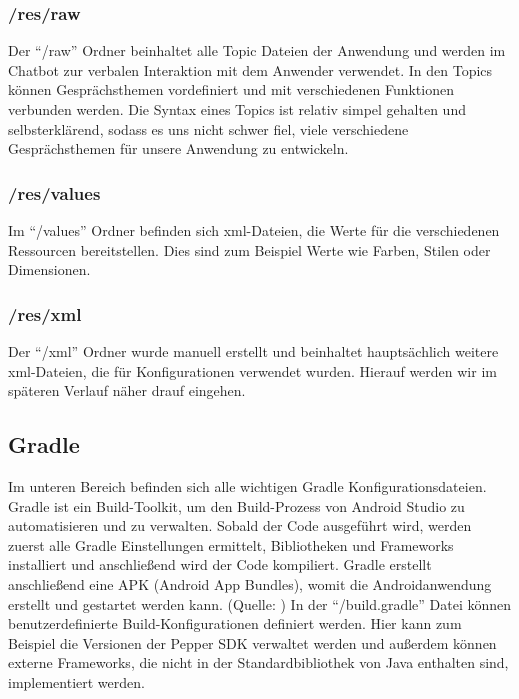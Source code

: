 \subsubsection*{/res/raw}
Der ``/raw'' Ordner beinhaltet alle Topic Dateien der Anwendung und werden im Chatbot zur verbalen Interaktion mit dem Anwender 
verwendet. In den Topics können Gesprächsthemen vordefiniert und mit verschiedenen Funktionen verbunden werden. Die Syntax eines Topics ist 
relativ simpel gehalten und selbsterklärend, sodass es uns nicht schwer fiel, viele verschiedene Gesprächsthemen für unsere Anwendung zu entwickeln. \\

\subsubsection*{/res/values}
Im ``/values'' Ordner befinden sich xml-Dateien, die Werte für die verschiedenen Ressourcen bereitstellen. Dies sind zum Beispiel
 Werte wie Farben, Stilen oder Dimensionen.\\

 \subsubsection*{/res/xml}
Der ``/xml'' Ordner wurde manuell erstellt und beinhaltet hauptsächlich weitere xml-Dateien, die für Konfigurationen verwendet 
wurden. Hierauf werden wir im späteren Verlauf näher drauf eingehen. \\

\subsection{Gradle}

Im unteren Bereich befinden sich alle wichtigen Gradle Konfigurationsdateien. Gradle ist ein Build-Toolkit, um den Build-Prozess von Android Studio 
zu automatisieren und zu verwalten. Sobald der Code ausgeführt wird, werden zuerst alle Gradle Einstellungen ermittelt, Bibliotheken und Frameworks 
installiert und anschließend wird der Code kompiliert. Gradle erstellt anschließend eine APK (Android App Bundles), womit die Androidanwendung 
erstellt und gestartet werden kann. 
(Quelle: \cite{Gradle})
In der ``/build.gradle'' Datei können benutzerdefinierte Build-Konfigurationen definiert werden. Hier kann zum Beispiel die Versionen der Pepper 
SDK verwaltet werden und außerdem können externe Frameworks, die nicht in der Standardbibliothek von Java enthalten sind, implementiert werden.\\

